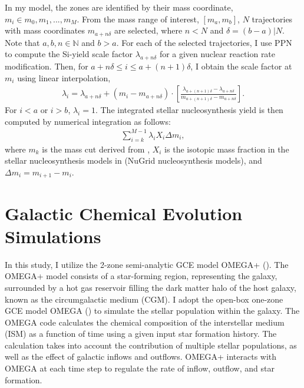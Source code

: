\documentclass{brandeis-thesis3.2}
\begin{document}
In my model, the zones are identified by their mass coordinate, $m_i \in {m_0, m_1, ..., m_M}$. From the mass range of interest, $[m_a, m_b]$, $N$ trajectories with mass coordinates $m_{a+n\delta}$ are selected, where $n<N$ and $\delta=(b-a)|N$. Note that $a, b, n\in \mathbb{N}$ and $b>a$. For each of the selected trajectories, I use PPN to compute the Si-yield scale factor $\lambda_{a+n\delta}$ for a given nuclear reaction rate modification. Then, for $a+n\delta\leq i \leq a+(n+1)\delta$, I obtain the scale factor at $m_i$ using linear interpolation,
\begin{align}
\lambda_i = \lambda_{a+n\delta} + (m_i-m_{a+n\delta})\cdot \left[ \frac{\lambda_{a+(n+1)\delta}-\lambda_{a+n\delta}}{m_{a+(n+1)\delta}-m_{a+n\delta}}\right].
\end{align}
For $i<a$ or $i>b$, $\lambda_i=1$. The integrated stellar nucleosynthesis yield is then computed by numerical integration as follows:
\begin{align}
\sum_{i=k}^{M-1} \lambda_i X_i \Delta m_i,
\end{align}
where $m_k$ is the mass cut derived from \cite{Fryer_2012}, $X_i$ is the isotopic mass fraction in the stellar nucleosynthesis models in \cite{Ritter_2018} (NuGrid nucleosynthesis models), and $\Delta m_i = m_{i+1}-m_i$.

\section{Galactic Chemical Evolution Simulations} \label{gce}

In this study, I utilize the 2-zone semi-analytic GCE model OMEGA+ (\citealt{Cote_2018}). The OMEGA+ model consists of a star-forming region, representing the galaxy, surrounded by a hot gas reservoir filling the dark matter halo of the host galaxy, known as the circumgalactic medium (CGM). I adopt the open-box one-zone GCE model OMEGA (\citealt{cote17}) to simulate the stellar population within the galaxy. The OMEGA code calculates the chemical composition of the interstellar medium (ISM) as a function of time using a given input star formation history. The calculation takes into account the contribution of multiple stellar populations, as well as the effect of galactic inflows and outflows. OMEGA+ interacts with OMEGA at each time step to regulate the rate of inflow, outflow, and star formation. 
\end{document}
